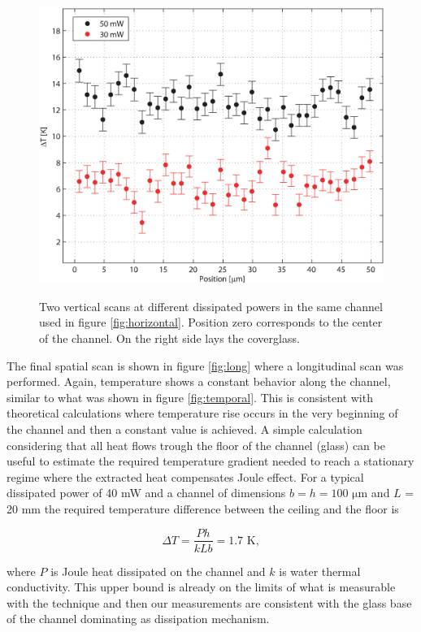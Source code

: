 \documentclass[twocolumn]{svjour3}       %
\begin{document}
\begin{figure}[h!]
\centering
\includegraphics[width=\columnwidth]{figs/vertical.eps}
\label{fig:vertical}
\caption{Two vertical scans at different dissipated powers in the same channel used in figure \ref{fig:horizontal}. Position zero corresponds to the center of the channel. On the right side lays the coverglass.}
\end{figure}

The final spatial scan is shown in figure \ref{fig:long} where a longitudinal scan was performed. Again, temperature shows a constant behavior along the channel, similar to what was shown in figure \ref{fig:temporal}. This is consistent with theoretical calculations \cite{jouleteorico} where temperature rise occurs in the very beginning of the channel and then a constant value is achieved. A simple calculation considering that all heat flows trough the floor of the channel (glass) can be useful to estimate the required temperature gradient needed to reach a stationary regime where the extracted heat compensates Joule effect. For a typical dissipated power of 40 mW and a channel of dimensions $b = h = 100$ $\mathrm{\mu m}$ and $L$ = 20 mm the required temperature difference between the ceiling and the floor is 

\begin{equation}
\Delta T = \frac{Ph}{kLb} = 1.7\,\, \mathrm{K},
\end{equation}

where $P$ is Joule heat dissipated on the channel and $k$ is water thermal conductivity. This upper bound is already on the limits of what is measurable with the technique and then our measurements are consistent with the glass base of the channel dominating as dissipation mechanism. 
\end{document}
